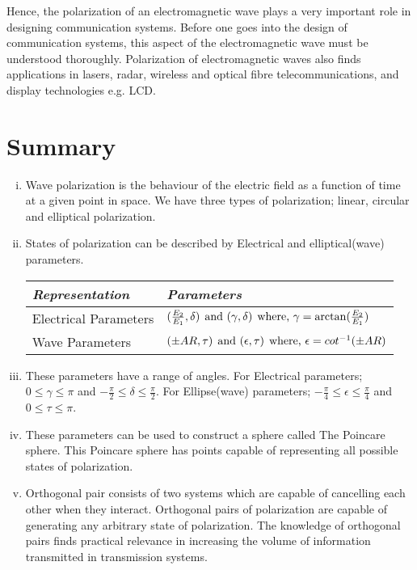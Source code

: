 Hence, the polarization of an electromagnetic wave plays a very important role in designing communication systems. Before one goes into the design of communication systems, this aspect of the electromagnetic wave must be understood thoroughly. Polarization of electromagnetic waves also finds applications in lasers, radar, wireless and optical fibre telecommunications, and display technologies e.g. LCD.

\section{Summary}
\begin{enumerate}[(i)]
\item Wave polarization is the behaviour of the electric field as a function of time at a given point in space. We have three types of polarization; linear, circular and elliptical polarization.
\item States of polarization can be described by Electrical and elliptical(wave) parameters.

\begin{tabular}{|l|m{4.5cm}|}
\hline 
\textit{Representation} & \textit{Parameters} \\
\hline %
Electrical Parameters &  $ (\frac{E_{2}}{E_{1}}, \delta)\hspace{0.15cm}  \text{and } (\gamma, \delta)\hspace{0.15cm} \text{where, } \gamma = \arctan(\frac{E_{2}}{E_{1}}) $\\
\hline     %
Wave Parameters & $ (\pm AR, \tau)\hspace{0.15cm}  \text{and } (\epsilon, \tau)\hspace{0.15cm} \text{where, } \epsilon = cot^{-1}(\pm AR) $ \\ 
\hline %
\end{tabular}

\item These parameters have a range of angles. For Electrical parameters; $ 0 \leq \gamma \leq \pi $ and $ -\frac{\pi}{2} \leq \delta \leq \frac{\pi}{2}$. For Ellipse(wave) parameters; $ -\frac{\pi}{4} \leq \epsilon \leq \frac{\pi}{4}$ and $ 0 \leq \tau \leq \pi $.

\item These parameters can be used to construct a sphere called The Poincare sphere. This Poincare sphere has points capable of representing all possible states of polarization.

\item  Orthogonal pair consists of two systems which are capable of cancelling each other when they interact. Orthogonal pairs of polarization are capable of generating any arbitrary state of polarization. The knowledge of orthogonal pairs finds practical relevance in increasing the volume of information transmitted in transmission systems. 


\end{enumerate}
